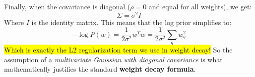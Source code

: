\begin{deepeningbox}
    \highspace
    Finally, when the covariance is diagonal ($\rho = 0$ and equal for all weights), we get:
    \begin{equation*}
        \Sigma = \sigma^2 I
    \end{equation*}
    Where $I$ is the identity matrix. This means that the log prior simplifies to:
    \begin{equation*}
        -\log P\left(w\right) = \dfrac{1}{2 \sigma^{2}} w^{T} w = \dfrac{1}{2 \sigma^{2}} \sum_{q} w_q^2
    \end{equation*}
    \hl{Which is exactly the L2 regularization term we use in weight decay!} So the assumption of a \emph{multivariate Gaussian with diagonal covariance} is what mathematically justifies the standard \textbf{weight decay formula}.
\end{deepeningbox}

